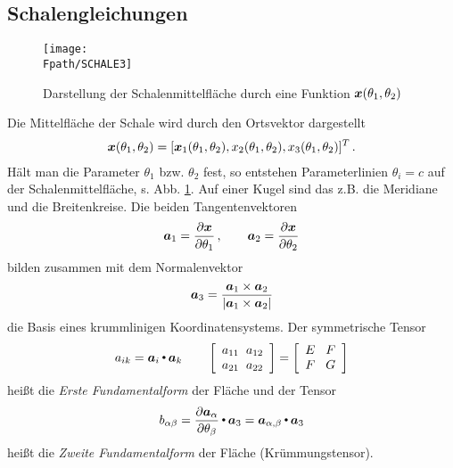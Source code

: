 {\textcolor{sectionTitleBlue}{\section{Schalengleichungen}}}\label{Schalengleichungen}
\begin{figure}[h]
\if {} \sidecaption \fi
\texttt{[image: \\Fpath/SCHALE3]}
\caption{Darstellung der Schalenmittelfl\"{a}che durch eine Funktion $\mbox{\boldmath $x$}(\theta_1,\theta_2)$} \label{Schale3}
\end{figure}
Die Mittelfl\"{a}che der Schale wird durch den Ortsvektor dargestellt
\begin{align}
\mbox{\boldmath $x$}(\theta_1,\theta_2) = [\mbox{\boldmath $x$}_1(\theta_1,\theta_2),x_2(\theta_1,\theta_2),x_3(\theta_1,\theta_2)]^{T}\,.
\end{align}
H\"{a}lt man die Parameter $\theta_1$ bzw. $\theta_2$ fest, so entstehen Parameterlinien
$\theta_i = c$ auf der Schalenmittelfl\"{a}che, s. Abb. \ref{Schale3}. Auf einer Kugel
sind das z.B. die Meridiane und die Breitenkreise. Die beiden Tangentenvektoren
\begin{align}
\mbox{\boldmath $a$}_1 = \frac{\partial \mbox{\boldmath $x$}}{\partial \theta_1}\,,\qquad \mbox{\boldmath $a$}_2 = \frac{\partial
\mbox{\boldmath $x$}}{\partial \theta_2}
\end{align}
bilden zusammen mit dem Normalenvektor
\begin{align}
\mbox{\boldmath $a$}_3 = \frac{\mbox{\boldmath $a$}_1 \times \mbox{\boldmath $a$}_2}{|\mbox{\boldmath $a$}_1 \times \mbox{\boldmath $a$}_2|}
\end{align}
die Basis eines krummlinigen Koordinatensystems. Der symmetrische Tensor
\begin{align}
a_{ik} = \vek a_i \dotprod \vek a_k \qquad \left[\barr{c@{\hspace{2mm}} c} a_{11} & a_{12} \\
a_{21} & a_{22} \earr \right] = \left[\barr{c@{\hspace{3mm}} c} E & F \\
F & G \earr \right]
\end{align}
hei{\ss}t die {\em Erste Fundamentalform\/} der Fl\"{a}che und der Tensor
\begin{align}
b_{\alpha \beta} = \frac{\partial \mbox{\boldmath $a$}_\alpha}{\partial  \theta_\beta} {\,\scriptscriptstyle \stackrel{\bullet}{{}}}\, \mbox{\boldmath $a$}_3 = \mbox{\boldmath $a$}_{\alpha,\beta} {\,\scriptscriptstyle \stackrel{\bullet}{{}}}\, \mbox{\boldmath $a$}_3
\end{align}
hei{\ss}t die {\em Zweite Fundamentalform\/} der Fl\"{a}che (Kr\"{u}mmungstensor).


